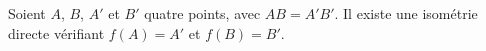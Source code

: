 Soient $A$, $B$, $A'$ et $B'$  quatre points, avec $AB=A'B'$. Il existe une isométrie directe vérifiant $f(A)=A'$ et $f(B)=B'$.

\begin{reponses}
\end{reponses}


